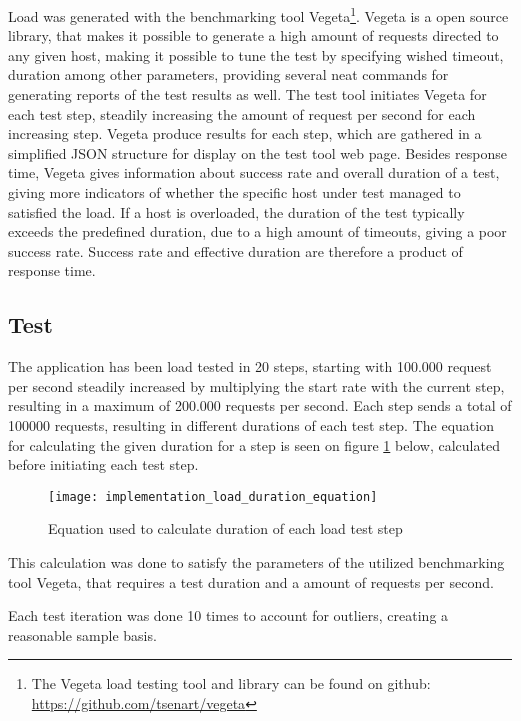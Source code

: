 Load was generated with the benchmarking tool Vegeta\footnote{The Vegeta load testing tool and library can be found on github: \url{https://github.com/tsenart/vegeta}}. Vegeta is a open source library, that makes it possible to generate a high amount of requests directed to any given host, making it possible to tune the test by specifying wished timeout, duration among other parameters, providing several neat commands for generating reports of the test results as well. The test tool initiates Vegeta for each test step, steadily increasing the amount of request per second for each increasing step. Vegeta produce results for each step, which are gathered in a simplified JSON structure for display on the test tool web page. Besides response time, Vegeta gives information about success rate and overall duration of a test, giving more indicators of whether the specific host under test managed to satisfied the load. If a host is overloaded, the duration of the test typically exceeds the predefined duration, due to a high amount of timeouts, giving a poor success rate. Success rate and effective duration are therefore a product of response time.

\subsection{Test}
The application has been load tested in 20 steps, starting with 100.000 request per second steadily increased by multiplying the start rate with the current step, resulting in a maximum of 200.000 requests per second. Each step sends a total of 100000 requests, resulting in different durations of each test step. The equation for calculating the given duration for a step is seen on figure \ref{fig:implementation_load_duration_equation} below, calculated before initiating each test step.

\begin{figure}[!htb]
  \texttt{[image: implementation\_load\_duration\_equation]}  
  \caption{Equation used to calculate duration of each load test step}
  \label{fig:implementation_load_duration_equation}
\end{figure}

This calculation was done to satisfy the parameters of the utilized benchmarking tool Vegeta, that requires a test duration and a amount of requests per second.

Each test iteration was done 10 times to account for outliers, creating a reasonable sample basis.


